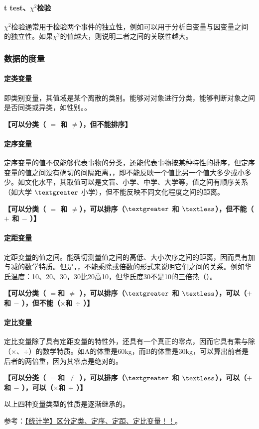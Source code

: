 \paragraph{t test、$\chi^2$检验}
$\chi^2$检验通常用于检验两个事件的独立性，例如可以用于分析自变量与因变量之间的独立性。如果$\chi^2$的值越大，则说明二者之间的关联性越大。

\subsubsection{数据的度量}
\paragraph{定类变量}
即类别变量，其值域是某个离散的类别。能够对对象进行分类，能够判断对象之间是否同类或异类，如性别。。

\textbf{【可以分类（ $=$ 和 $\neq$），但不能排序】}

\paragraph{定序变量}
定序变量的值不仅能够代表事物的分类，还能代表事物按某种特性的排序，但定序变量的值之间没有确切的间隔距离，，即不能反映一个值比另一个值大多少或小多少。如文化水平，其取值可以是文盲、小学、中学、大学等，值之间有顺序关系（如大学 $\textgreater$ 小学），但不能反映不同文化程度之间的距离。

\textbf{【可以分类（ $=$ 和 $\neq$），可以排序（$\textgreater$ 和 $\textless$），但不能（$+$ 和 $-$ ）】}

\paragraph{定距变量}
定距变量的值之间。能确切测量值之间的高低、大小次序之间的距离，因而具有加与减的数学特质。但是，，不能乘除或倍数的形式来说明它们之间的关系。例如华氏温度：10、20、30，30比20高10，但华氏度30不是10的三倍热（）。

\textbf{【可以分类（ $=$和 $\neq$ ），可以排序（$\textgreater$ 和 $\textless$），可以（$+$ 和 $-$ ），但不能（$\times$和 $\div$ ）】}

\paragraph{定比变量}
定比变量除了具有定距变量的特性外，还具有一个真正的零点，因而它具有乘与除（×、÷）的数学特质。如A的体重是60kg，而B的体重是30kg，可以算出前者是后者的两倍重，因为其零点是绝对的。

\textbf{【可以分类（ $=$和 $\neq$ ），可以排序（$\textgreater$ 和 $\textless$），可以（$+$ 和 $-$ ），可以（$\times$和 $\div$ ）】}

以上四种变量类型的性质是逐渐继承的。

参考：\href{https://blog.csdn.net/YYIverson/article/details/100068865}{【统计学】区分定类、定序、定距、定比变量！！}。